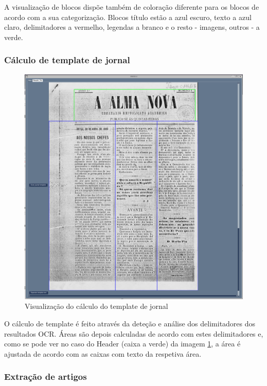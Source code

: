 A visualização de blocos dispõe também de coloração diferente para os blocos de acordo com a sua categorização. Blocos título estão a azul escuro, texto a azul claro, delimitadores a vermelho, legendas a branco e o resto - imagens, outros - a verde.

\subsubsection{Cálculo de template de jornal}

\begin{figure}[H]
    \centering
    \includegraphics[width=1\textwidth]{images/implementacao/gui/gui_draw_template.png}
    \caption{Visualização do cálculo do template de jornal}
    \label{fig:gui_draw_template}
\end{figure}

O cálculo de template é feito através da deteção e análise dos delimitadores dos resultados OCR. Áreas são depois calculadas de acordo com estes delimitadores e, como se pode ver no caso do Header (caixa a verde) da imagem \ref{fig:gui_draw_template}, a área é ajustada de acordo com as caixas com texto da respetiva área.

\subsubsection{Extração de artigos}

